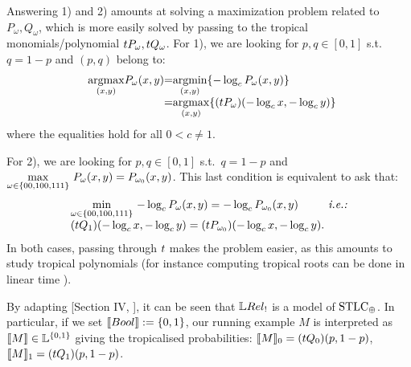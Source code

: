 Answering 1) and 2) amounts at solving a maximization problem related to $P_{\omega}, Q_\omega$, which is more easily solved by 
passing to the tropical monomials/polynomial $\trop P_{\omega},\trop Q_{\omega}$. 
For 1), we are looking for $p,q\in[0,1]$ s.t.\ $q=1-p$ and $(p,q)$ belong to:
\begin{equation}
  \begin{array}{r@{}c@{}l@{}}
   \underset{(x,y)}{\RM{arg max}} P_\omega (x,y)
   & = &
   \underset{(x,y)}{\RM{arg min}}\set{-\log_c P_\omega (x,y)}
   \\
   & = &
   \underset{(x,y)}{\RM{arg max}}\set{(\trop P_\omega) (-\log_c x,-\log_c y)} \label{eq:argmax}
  \end{array}
\end{equation}
where the equalities hold for all $0<c\neq1$.

For 2), %
we are looking for $p,q\in[0,1]$ s.t.\ $q=1-p$ and
$\max\limits_{\omega\in\{00,100,111\}} \, P_\omega(x,y) = P_{\omega_0}(x,y)$.
This last condition is equivalent to ask that:
\begin{equation}
  \begin{array}{l@{}l@{}}
    \min\limits_{\omega\in\set{00,100,111}} \, -\log_c P_\omega(x,y) = -\log_c P_{\omega_0}(x,y)
   & \textit{ i.e.: }
   \\
   (\trop Q_1)( -\log_c x, -\log_c y) = (\trop P_{\omega_0})( -\log_c x, -\log_c y). &  \label{eq:max}
  \end{array}
\end{equation}
In both cases, passing through $\trop $ %
makes the problem easier, as this amounts to study tropical polynomials (for instance computing tropical roots can be done in linear time \cite{Noferini2015}). %

\begin{remark}
 By adapting [Section IV, \cite{Manzo2013}], it can be seen that $\LREL_!$ is a model of $\mathrm{STLC}_\oplus$.
 In particular, if we set $\model \bool:=\set{0,1}$, our running example $M$ is interpreted as $\llbracket M\rrbracket\in\mathbb{L}^{\{0,1\}}$ giving the tropicalised probabilities: $\model M_0=(\trop Q_0)(p,1-p)$, $\model M_1=(\trop Q_1)(p,1-p)$.
\end{remark}

